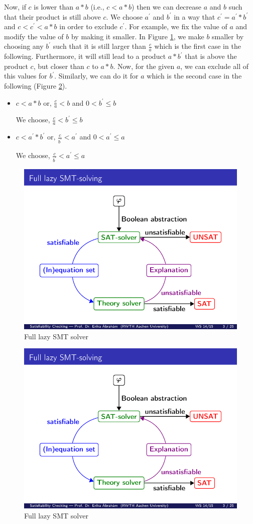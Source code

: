 \noindent Now, if $c$ is lower than $a \ast b$ (i.e., $c < a \ast b$) then we can decrease $a$ and $b$ such that their product is still above $c$.
We choose $a^\prime$ and $b^\prime$ in a way that $c^\prime = a^\prime \ast b^\prime$ and $c < c^\prime < a \ast b$ in order to exclude $c^\prime$.
For example, we fix the value of $a$ and modify the value of $b$ by making it smaller.
In Figure \ref{fig:FixAModifyB}, we make $b$ smaller by choosing any $b^\prime$ such that it is still larger than $\frac{c}{a}$ which is the first case in the following.
Furthermore, it will still lead to a product $a \ast b^\prime$ that is above the product $c$, but closer than $c$ to $a \ast b$.
Now, for the given $a$, we can exclude all of this values for $b^\prime$.
Similarly, we can do it for $a$ which is the second case in the following (Figure \ref{fig:FixBModifyA}).\newline


\begin{itemize}
    \item $c < a \ast b \text{ or, } \frac{c}{a} < b$ and $0 < b^\prime \leq b$\newline
    
    We choose, $\frac{c}{a} < b^\prime \leq b$
     \item $c < a^\prime \ast b^\prime \text{ or, } \frac{c}{b^\prime} < a^\prime$ and $0 < a^\prime \leq a$\newline
     
     We choose, $\frac{c}{b^\prime} < a^\prime \leq a$
\end{itemize}

\begin{figure}[ht!]
  \centering
  \includegraphics[width=0.25\linewidth]{./figures/FullLazySMT.pdf}
  \caption{Full lazy SMT solver}
  \label{fig:FixAModifyB}
\end{figure}

\begin{figure}[ht!]
  \centering
  \includegraphics[width=0.25\linewidth]{./figures/FullLazySMT.pdf}
  \caption{Full lazy SMT solver}
  \label{fig:FixBModifyA}
\end{figure}

